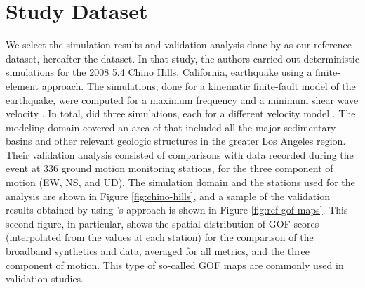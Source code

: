 
\section{Study Dataset}

We select the simulation results and validation analysis done by \citet{Taborda_2014_BSSA} as our reference dataset, hereafter the dataset. In that study, the authors carried out deterministic simulations for the 2008  5.4 Chino Hills, California, earthquake using a finite-element approach. The simulations, done for a kinematic finite-fault model of the earthquake, were computed for a maximum frequency  and a minimum shear wave velocity . In total, \citet{Taborda_2014_BSSA} did three simulations, each for a different velocity model \citep[CVM-S4, CVM-H, CVM-H+GTL, see][]{Small_2017_SRL}. The modeling domain covered an area of  that included all the major sedimentary basins and other relevant geologic structures in the greater Los Angeles region. Their validation analysis consisted of comparisons with data recorded during the event at 336 ground motion monitoring stations, for the three component of motion (EW, NS, and UD). The simulation domain and the stations used for the analysis are shown in Figure \ref{fig:chino-hills}, and a sample of the validation results obtained by \citet{Taborda_2014_BSSA} using \citeauthor{Anderson_2004_Proc}'s approach is shown in Figure \ref{fig:ref-gof-maps}. This second figure, in particular, shows the spatial distribution of GOF scores (interpolated from the values at each station) for the comparison of the broadband synthetics and data, averaged for all metrics, and the three component of motion. This type of so-called GOF maps are commonly used in validation studies.


